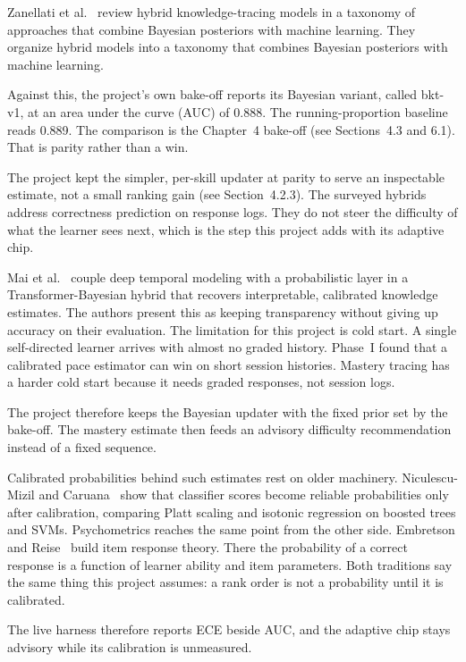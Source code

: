 Zanellati et al.~\cite{zanellati2024} review hybrid knowledge-tracing models in a taxonomy of approaches that combine Bayesian posteriors with machine learning. They organize hybrid models into a taxonomy that combines Bayesian posteriors with machine learning.

Against this, the project's own bake-off reports its Bayesian variant, called bkt-v1, at an area under the curve (AUC) of 0.888. The running-proportion baseline reads 0.889. The comparison is the Chapter~4 bake-off (see Sections~4.3 and 6.1). That is parity rather than a win.

The project kept the simpler, per-skill updater at parity to serve an inspectable estimate, not a small ranking gain (see Section~4.2.3). The surveyed hybrids address correctness prediction on response logs. They do not steer the difficulty of what the learner sees next, which is the step this project adds with its adaptive chip.

Mai et al.~\cite{mai2025} couple deep temporal modeling with a probabilistic layer in a Transformer-Bayesian hybrid that recovers interpretable, calibrated knowledge estimates. The authors present this as keeping transparency without giving up accuracy on their evaluation. The limitation for this project is cold start. A single self-directed learner arrives with almost no graded history. Phase~I found that a calibrated pace estimator can win on short session histories. Mastery tracing has a harder cold start because it needs graded responses, not session logs.

The project therefore keeps the Bayesian updater with the fixed prior set by the bake-off. The mastery estimate then feeds an advisory difficulty recommendation instead of a fixed sequence.

Calibrated probabilities behind such estimates rest on older machinery. Niculescu-Mizil and Caruana~\cite{niculescu2005} show that classifier scores become reliable probabilities only after calibration, comparing Platt scaling and isotonic regression on boosted trees and SVMs. Psychometrics reaches the same point from the other side. Embretson and Reise~\cite{embretson2000} build item response theory. There the probability of a correct response is a function of learner ability and item parameters. Both traditions say the same thing this project assumes: a rank order is not a probability until it is calibrated.

The live harness therefore reports ECE beside AUC, and the adaptive chip stays advisory while its calibration is unmeasured.

